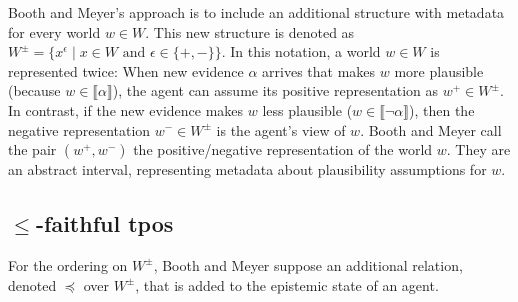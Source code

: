 \documentclass[english, 12pt]{scrartcl}
\theoremstyle{definition}
\theoremstyle{definition}
\theoremstyle{definition}
\newcommand{\modelsOf}[1]{\llbracket #1 \rrbracket}
\begin{document}
Booth and Meyer's \cite{Booth2011} approach is to include an additional structure with metadata for every world $w \in W$. This new structure is denoted as $W^{\pm} = \{x^{\epsilon} \mid x \in W \textrm{ and } \epsilon \in \{+, -\}\}$. In this notation, a world $w \in W$ is represented twice: When new evidence $\alpha$ arrives that makes $w$ more plausible (because $w \in \modelsOf{\alpha}$), the agent can assume its positive representation as $w^{+} \in W^{\pm}$. In contrast, if the new evidence makes $w$ less plausible ($w \in \modelsOf{\neg\alpha}$), then the negative representation $w^{-} \in W^{\pm}$ is the agent's view of $w$. Booth and Meyer call the pair $(w^{+}, w^{-})$ the positive/negative representation of the world $w$. They are an abstract interval, representing metadata about plausibility assumptions for $w$.

\subsection{$\leq$-faithful tpos}
For the ordering on $W^{\pm}$, Booth and Meyer suppose an additional relation, denoted $\preceq$ over $W^{\pm}$, that is added to the epistemic state of an agent.
\end{document}
